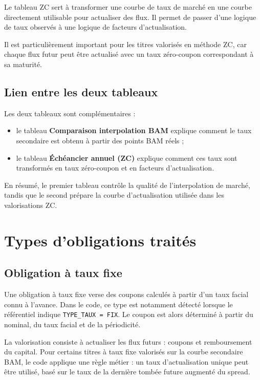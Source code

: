 \documentclass[12pt,a4paper]{article}
\begin{document}
Le tableau ZC sert à transformer une courbe de taux de marché en une courbe directement utilisable pour actualiser des flux. Il permet de passer d'une logique de taux observés à une logique de facteurs d'actualisation.

Il est particulièrement important pour les titres valorisés en méthode ZC, car chaque flux futur peut être actualisé avec un taux zéro-coupon correspondant à sa maturité.

\subsection{Lien entre les deux tableaux}

Les deux tableaux sont complémentaires :

\begin{itemize}
    \item le tableau \textbf{Comparaison interpolation BAM} explique comment le taux secondaire est obtenu à partir des points BAM réels ;
    \item le tableau \textbf{Échéancier annuel (ZC)} explique comment ces taux sont transformés en taux zéro-coupon et en facteurs d'actualisation.
\end{itemize}

En résumé, le premier tableau contrôle la qualité de l'interpolation de marché, tandis que le second prépare la courbe d'actualisation utilisée dans les valorisations ZC.

\section{Types d'obligations traités}

\subsection{Obligation à taux fixe}

Une obligation à taux fixe verse des coupons calculés à partir d'un taux facial connu à l'avance. Dans le code, ce type est notamment détecté lorsque le référentiel indique \texttt{TYPE\_TAUX = FIX}. Le coupon est alors déterminé à partir du nominal, du taux facial et de la périodicité.

La valorisation consiste à actualiser les flux futurs : coupons et remboursement du capital. Pour certains titres à taux fixe valorisés sur la courbe secondaire BAM, le code applique une règle métier : un taux d'actualisation unique peut être utilisé, basé sur le taux de la dernière tombée future augmenté du spread.
\end{document}
